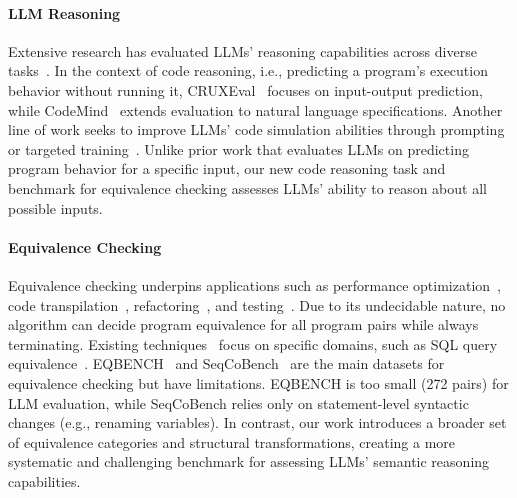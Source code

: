 \paragraph{LLM Reasoning} Extensive research has evaluated LLMs' reasoning capabilities across diverse tasks~\cite{cobbe2021training,huang2022towards,bubeck2023sparks,mirzadeh2024gsm,zhou2022least,ho2022large,wei2022chain,chen2024large,clark2018think,zhang2024transformer}. In the context of code reasoning, i.e., predicting a program's execution behavior without running it, CRUXEval~\cite{gu2024cruxeval} focuses on input-output prediction, while CodeMind~\cite{liu2024codemind} extends evaluation to natural language specifications. Another line of work seeks to improve LLMs' code simulation abilities through prompting~\cite{la2024code} or targeted training~\cite{liu2023code,ni2024next,ding2024semcoder}. Unlike prior work that evaluates LLMs on predicting program behavior for a specific input, our new code reasoning task and benchmark for equivalence checking assesses LLMs' ability to reason about all possible inputs.

\paragraph{Equivalence Checking} Equivalence checking underpins applications such as performance optimization~\cite{shypula2023learning,cummins2023large,cummins2024meta}, code transpilation~\cite{lu2021codexglue,yang2024exploring,ibrahimzada2024repository,pan2024lost}, refactoring~\cite{pailoor2024semantic}, and testing~\cite{felsing2014automating,tian2024large}. Due to its undecidable nature, no algorithm can decide program equivalence for all program pairs while always terminating. Existing techniques~\cite{sharma2013data,dahiya2017black,gupta2018effective,mora2018client,churchill2019semantic,badihi2020ardiff} focus on specific domains, such as SQL query equivalence~\cite{zhao2023llm,ding2023proving,singh2024exploring}. EQBENCH~\cite{badihi2021eqbench} and SeqCoBench~\cite{maveli2024can} are the main datasets for equivalence checking but have limitations. EQBENCH is too small (272 pairs) for LLM evaluation, while SeqCoBench relies only on statement-level syntactic changes (e.g., 
renaming variables). In contrast, our work introduces a broader set of equivalence categories and structural transformations, creating a more systematic and challenging benchmark for assessing LLMs' semantic reasoning capabilities.
